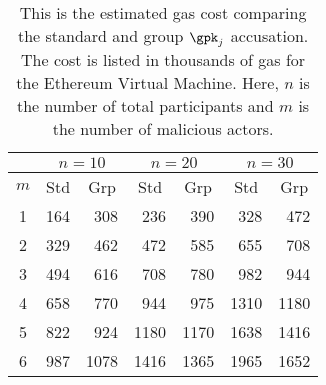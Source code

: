 \begin{table}
\centering
\begin{tabular}{|c||r|r||r|r||r|r|}
\hline
  & \multicolumn{2}{|c||}{$n = 10$} & \multicolumn{2}{|c||}{$n = 20$} &
    \multicolumn{2}{|c|}{$n = 30$} \\
\hline
    $m$ & \multicolumn{1}{|c|}{Std} & \multicolumn{1}{|c||}{Grp} &
          \multicolumn{1}{|c|}{Std} & \multicolumn{1}{|c||}{Grp} &
          \multicolumn{1}{|c|}{Std} & \multicolumn{1}{|c||}{Grp} \\
\hline
    1 & 164 &  308 &  236 &  390 &  328 &  472 \\
    2 & 329 &  462 &  472 &  585 &  655 &  708 \\
    3 & 494 &  616 &  708 &  780 &  982 &  944 \\
    4 & 658 &  770 &  944 &  975 & 1310 & 1180 \\
    5 & 822 &  924 & 1180 & 1170 & 1638 & 1416 \\
    6 & 987 & 1078 & 1416 & 1365 & 1965 & 1652 \\
\hline
\end{tabular}
\caption[Malicious $\gpk_{j}$ Accusation Gas Cost]{
This is the estimated gas cost comparing the standard and group
$\gpk_{j}$ accusation. The cost is listed in thousands of gas
for the Ethereum Virtual Machine.
Here, $n$ is the number of total participants and $m$ is the number
of malicious actors.
}
\label{tab:gpkj_gas_cost}
\end{table}
